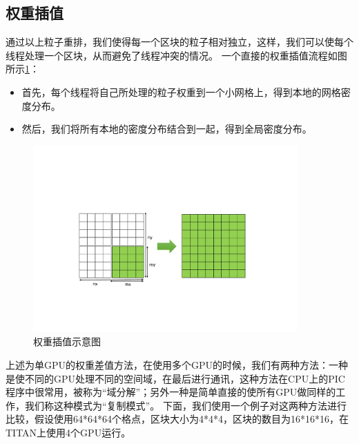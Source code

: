 \subsection{权重插值}
\label{section:PIC_GPU_depositor}
通过以上粒子重排，我们使得每一个区块的粒子相对独立，这样，我们可以使每个线程处理一个区块，从而避免了线程冲突的情况。
一个直接的权重插值流程如图所示\ref{fig:PIC_combine}：
\begin{itemize}
  \item 首先，每个线程将自己所处理的粒子权重到一个小网格上，得到本地的网格密度分布。
  \item 然后，我们将所有本地的密度分布结合到一起，得到全局密度分布。
\end{itemize}
\begin{figure}[!htb]
    \centering
    \includegraphics[width=0.9\textwidth]{Img/3PIC_combine.pdf}
    \caption{权重插值示意图}
    \label{fig:PIC_combine}
\end{figure}

上述为单GPU的权重差值方法，在使用多个GPU的时候，我们有两种方法：一种是使不同的GPU处理不同的空间域，在最后进行通讯，这种方法在CPU上的PIC程序中很常用，被称为“域分解”；另外一种是简单直接的使所有GPU做同样的工作，我们称这种模式为“复制模式”。
下面，我们使用一个例子对这两种方法进行比较，假设使用64*64*64个格点，区块大小为4*4*4，区块的数目为16*16*16，在TITAN上使用4个GPU运行。

